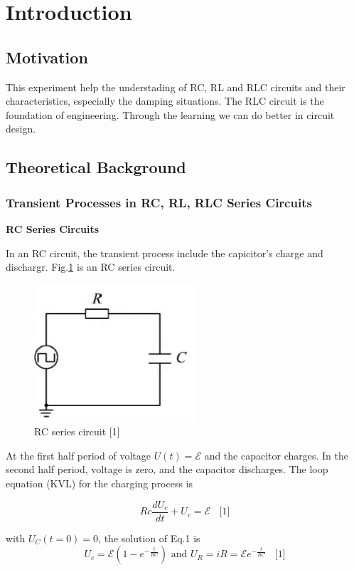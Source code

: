 \documentclass[12pt,a4paper]{article}
\begin{document}
\section{Introduction}
\subsection{Motivation}
This experiment help the understading of RC, RL and RLC circuits and their characteristics, especially the damping situations. The RLC circuit is the foundation of engineering. Through the learning we can do better in circuit design. 

\subsection{Theoretical Background}
\subsubsection{Transient Processes in RC, RL, RLC Series Circuits}
\textbf{\qquad RC Series Circuits} \par
In an RC circuit, the transient process include the capicitor's charge and dischargr. Fig.\ref{rccir} is an RC series circuit.
\begin{figure}[H]
    \centering
    \includegraphics[width=6cm]{rccir.png}
    \caption{RC series circuit    [1]}
    \label{rccir}
\end{figure}

At the first half period of voltage $U(t) =\mathcal{E}$ and the capacitor charges. In the second half period, voltage is zero, and the capacitor discharges. The loop equation (KVL) for the charging process is

\begin{equation}
    Rc\frac{dU_c}{dt}+U_c=\mathcal{E}~~~~\text{[1]}
\end{equation}

with $U_C(t = 0) = 0$, the solution of Eq.1 is
$$U_c=\mathcal{E}(1-e^{-\frac{t}{RC}})\text{ and }U_R=iR=\mathcal{E}e^{-\frac{t}{RC}}~~~~\text{[1]}$$
\end{document}
